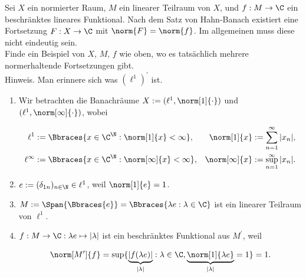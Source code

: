 \begin{exercise}

Sei $X$ ein normierter Raum, $M$ ein linearer Teilraum von $X$, und $f: M \to \C$ ein beschränktes lineares Funktional.
Nach dem Satz von Hahn-Banach existiert eine Fortsetzung $F: X \to \C$ mit $\norm{F} = \norm{f}$.
Im allgemeinen muss diese nicht eindeutig sein. \\

Finde ein Beispiel von $X$, $M$, $f$ wie oben, wo es tatsächlich mehrere normerhaltende Fortsetzungen gibt. \\

Hinweis.
Man erinnere sich was $(\ell^1)^\prime$ ist.

\end{exercise}

\begin{solution}

\phantom{}

\begin{enumerate}

  \item
  Wir betrachten die Banachräume $X := (\ell^1, \norm[1]{\cdot})$ und $(\ell^1, \norm[\infty]{\cdot})$, wobei

  \begin{align*}
    \ell^1
    & :=
    \Bbraces
    {
      x \in \C^\N:
      \norm[1]{x} < \infty
    },
    &
    \norm[1]{x}
    & :=
    \sum_{n=1}^\infty |x_n|, \\
    \ell^\infty
    & :=
    \Bbraces
    {
      x \in \C^\N:
      \norm[\infty]{x} < \infty
    },
    &
    \norm[\infty]{x}
    & :=
    \sup_{n=1}^\infty |x_n|.
  \end{align*}

  \item
  $e := (\delta_{1n})_{n \in \N} \in \ell^1$, weil $\norm[1]{e} = 1$.

  \item
  $M :=
  \Span{\Bbraces{e}} =
  \Bbraces{\lambda e: \lambda \in \C}$ ist ein linearer Teilraum von $\ell^1$.

  \item
  $f: M \to \C: \lambda e \mapsto |\lambda|$ ist ein beschränktes Funktional aus $M^\prime$, weil

  \begin{align*}
    \norm[M^\prime]{f}
    =
    \sup
    \{
      \underbrace{|f(\lambda e)|}_{|\lambda|}:
      \lambda \in \C,
      \underbrace{\norm[1]{\lambda e}}_{|\lambda|} = 1
    \} = 1.
  \end{align*}


\end{enumerate}
\end{solution}
